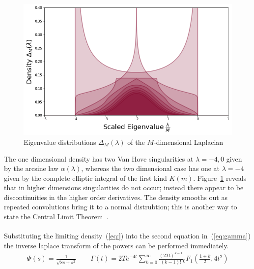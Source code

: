 \documentclass{article}[12pt]
\numberwithin{equation}{section}
\begin{document}
\begin{figure}[H]
\centering{}
\captionsetup{justification=centering}
\includegraphics[scale=0.45]{figures/density}
\caption{Eigenvalue distributions $\Delta_M(\lambda)$ of the $M$-dimensional Laplacian}
\label{fig:dos}
\end{figure}
\noindent
The one dimensional density has two Van Hove singularities at $\lambda=-4,0$
given by the arcsine law $\alpha(\lambda)$, whereas the two dimensional
case has one at $\lambda=-4$ given by the complete elliptic integral
of the first kind $K(m)$. Figure~\ref{fig:dos} reveals that in higher
dimensions singularities do not occur; instead there appear to be
discontinuities in the higher order derivatives. The density smooths out
as repeated convolutions bring it to a normal distrubtion; this is another
way to state the Central Limit Theorem~\cite{}.
\\\\
Substituting the limiting density~(\ref{eq:}) into the second equation
in~(\ref{eq:gamma}) the inverse laplace transform of the powers can be
performed immediately.
\begin{align}
  \Phi(s)=\frac{1}{\sqrt{8s + s^2}}
  \qquad
  \Gamma(t)=2Te^{-4t}
  \sum_{k=0}^{\infty}\frac{(2Tt)^{k-1}}{(k-1)!}
  {}_0F_1(\frac{1+k}{2},4t^2)
\end{align}
\end{document}
